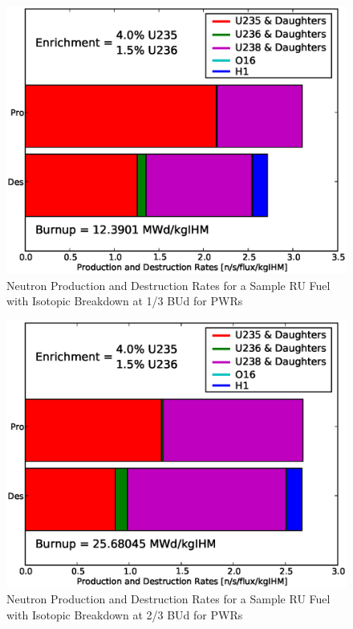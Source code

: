 \begin{figure}[htbp]
\caption{Neutron Production and Destruction Rates for a Sample RU Fuel with Isotopic Breakdown at 1/3 BUd for PWRs}
\label{1g_fig11}
\begin{center}
\includegraphics[scale=0.5]{one_group_method/figs/Fig11.eps}
\end{center}
\end{figure}

\begin{figure}[htbp]
\caption{Neutron Production and Destruction Rates for a Sample RU Fuel with Isotopic Breakdown at 2/3 BUd for PWRs}
\label{1g_fig12}
\begin{center}
\includegraphics[scale=0.5]{one_group_method/figs/Fig12.eps}
\end{center}
\end{figure}

